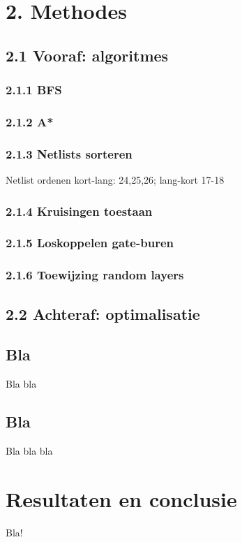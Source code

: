 \documentclass{article}
\begin{document}
	
	
	\section{2. Methodes}
	
	\subsection{2.1 Vooraf: algoritmes}
	
	\subsubsection{2.1.1 BFS}
	
	\subsubsection{2.1.2 A*}
	
	\subsubsection{2.1.3 Netlists sorteren}
	Netlist ordenen kort-lang: 24,25,26; lang-kort 17-18
	
	\subsubsection{2.1.4 Kruisingen toestaan}
	
	\subsubsection{2.1.5 Loskoppelen gate-buren}
	
	\subsubsection{2.1.6 Toewijzing random layers}
	
	\subsection{2.2 Achteraf: optimalisatie}
	
	
	\subsection{Bla}
	
	Bla bla
	
	\subsection{Bla}
	
	Bla bla bla
	
	\section{Resultaten en conclusie}
	
	Bla!
	
\end{document}
